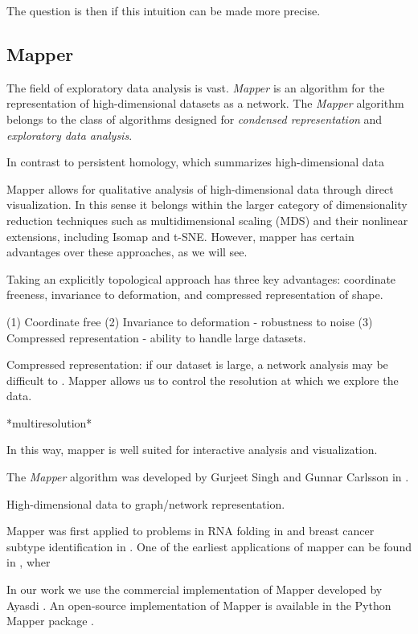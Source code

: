 The question is then if this intuition can be made more precise.


\subsection{Mapper}

The field of exploratory data analysis is vast.
\emph{Mapper} is an algorithm for the representation of high-dimensional datasets as a network.
The \emph{Mapper} algorithm belongs to the class of algorithms designed for \emph{condensed representation} and \emph{exploratory data analysis}.

In contrast to persistent homology, which summarizes high-dimensional data 

Mapper allows for qualitative analysis of high-dimensional data through direct visualization.
In this sense it belongs within the larger category of dimensionality reduction techniques such as multidimensional scaling (MDS) and their nonlinear extensions, including Isomap and t-SNE.
However, mapper has certain advantages over these approaches, as we will see.

Taking an explicitly topological approach has three key advantages: coordinate freeness, invariance to deformation, and compressed representation of shape.

(1) Coordinate free
(2) Invariance to deformation - robustness to noise
(3) Compressed representation - ability to handle large datasets.

Compressed representation: if our dataset is large, a network analysis may be difficult to .
Mapper allows us to control the resolution at which we explore the data.

*multiresolution*


In this way, mapper is well suited for interactive analysis and visualization.

The \emph{Mapper} algorithm was developed by Gurjeet Singh and Gunnar Carlsson in \cite{Singh:2007ve}.

High-dimensional data to graph/network representation.


Mapper was first applied to problems in RNA folding in \cite{Bowman:2008esa} and breast cancer subtype identification in \cite{Nicolau:2011}.
One of the earliest applications of mapper can be found in \cite{Nicolau:2011}, wher


In our work we use the commercial implementation of Mapper developed by Ayasdi \cite{AyasdiIris:2015}.
An open-source implementation of Mapper is available in the Python Mapper package \cite{Mullner:2013}.


